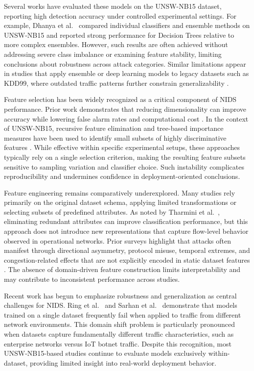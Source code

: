 \documentclass[pdflatex,sn-mathphys-num]{sn-jnl}
\theoremstyle{thmstyleone}%
\theoremstyle{thmstyletwo}%
\theoremstyle{thmstylethree}%
\begin{document}
Several works have evaluated these models on the UNSW-NB15 dataset, reporting high detection accuracy under controlled experimental settings. For example, Dhanya et al.~\cite{Dhanya202357} compared individual classifiers and ensemble methods on UNSW-NB15 and reported strong performance for Decision Trees relative to more complex ensembles. However, such results are often achieved without addressing severe class imbalance or examining feature stability, limiting conclusions about robustness across attack categories. Similar limitations appear in studies that apply ensemble or deep learning models to legacy datasets such as KDD99, where outdated traffic patterns further constrain generalizability \cite{Amanoul9495897}.

Feature selection has been widely recognized as a critical component of NIDS performance. Prior work demonstrates that reducing dimensionality can improve accuracy while lowering false alarm rates and computational cost \cite{Venkatachalam}. In the context of UNSW-NB15, recursive feature elimination and tree-based importance measures have been used to identify small subsets of highly discriminative features \cite{Venkatachalam, Tharmini8001537}. While effective within specific experimental setups, these approaches typically rely on a single selection criterion, making the resulting feature subsets sensitive to sampling variation and classifier choice. Such instability complicates reproducibility and undermines confidence in deployment-oriented conclusions.

Feature engineering remains comparatively underexplored. Many studies rely primarily on the original dataset schema, applying limited transformations or selecting subsets of predefined attributes. As noted by Tharmini et al.~\cite{Tharmini8001537}, eliminating redundant attributes can improve classification performance, but this approach does not introduce new representations that capture flow-level behavior observed in operational networks. Prior surveys highlight that attacks often manifest through directional asymmetry, protocol misuse, temporal extremes, and congestion-related effects that are not explicitly encoded in static dataset features \cite{Sarhan10_1007, RING2019147}. The absence of domain-driven feature construction limits interpretability and may contribute to inconsistent performance across studies.

Recent work has begun to emphasize robustness and generalization as central challenges for NIDS. Ring et al.~\cite{RING2019147} and Sarhan et al.~\cite{Sarhan10_1007} demonstrate that models trained on a single dataset frequently fail when applied to traffic from different network environments. This domain shift problem is particularly pronounced when datasets capture fundamentally different traffic characteristics, such as enterprise networks versus IoT botnet traffic. Despite this recognition, most UNSW-NB15-based studies continue to evaluate models exclusively within-dataset, providing limited insight into real-world deployment behavior.
\end{document}
